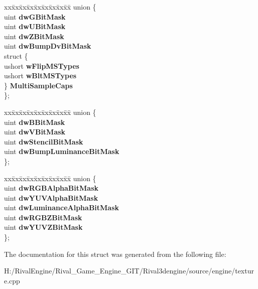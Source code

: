 \begin{DoxyCompactItemize}
\begin{tabbing}
\end{tabbing}\item 
\mbox{\label{struct_d_d_p_i_x_e_l_f_o_r_m_a_t_acd95bd5d5b6108af6e3f97b0cc45cf5a}} 
\begin{tabbing}
xx\=xx\=xx\=xx\=xx\=xx\=xx\=xx\=xx\=\kill
union \{\\
\>uint {\bfseries dwGBitMask}\\
\>uint {\bfseries dwUBitMask}\\
\>uint {\bfseries dwZBitMask}\\
\>uint {\bfseries dwBumpDvBitMask}\\
\>struct \{\\
\>\>ushort {\bfseries wFlipMSTypes}\\
\>\>ushort {\bfseries wBltMSTypes}\\
\>\} {\bfseries MultiSampleCaps}\\
\}; \\

\end{tabbing}\item 
\mbox{\label{struct_d_d_p_i_x_e_l_f_o_r_m_a_t_a71ca6637b13f56ecadb77528f9c0b472}} 
\begin{tabbing}
xx\=xx\=xx\=xx\=xx\=xx\=xx\=xx\=xx\=\kill
union \{\\
\>uint {\bfseries dwBBitMask}\\
\>uint {\bfseries dwVBitMask}\\
\>uint {\bfseries dwStencilBitMask}\\
\>uint {\bfseries dwBumpLuminanceBitMask}\\
\}; \\

\end{tabbing}\item 
\mbox{\label{struct_d_d_p_i_x_e_l_f_o_r_m_a_t_a701f48da25ed22170c8d89faa16f8637}} 
\begin{tabbing}
xx\=xx\=xx\=xx\=xx\=xx\=xx\=xx\=xx\=\kill
union \{\\
\>uint {\bfseries dwRGBAlphaBitMask}\\
\>uint {\bfseries dwYUVAlphaBitMask}\\
\>uint {\bfseries dwLuminanceAlphaBitMask}\\
\>uint {\bfseries dwRGBZBitMask}\\
\>uint {\bfseries dwYUVZBitMask}\\
\}; \\

\end{tabbing}\end{DoxyCompactItemize}


The documentation for this struct was generated from the following file\+:\begin{DoxyCompactItemize}
\item 
H\+:/\+Rival\+Engine/\+Rival\+\_\+\+Game\+\_\+\+Engine\+\_\+\+G\+I\+T/\+Rival3dengine/source/engine/texture.\+cpp\end{DoxyCompactItemize}
